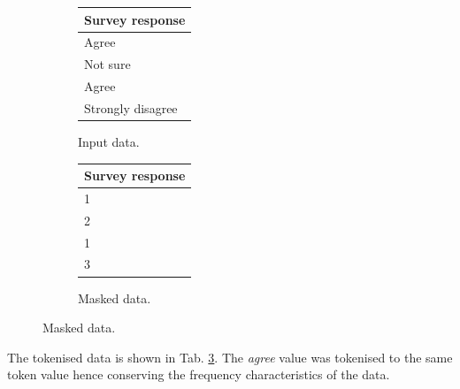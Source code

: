 \documentclass[a4paper,twoside,12pt]{book}
\begin{document}
\begin{figure}
\centering
\caption{Tokenisation.}
\begin{subfigure}{.4\textwidth}
	\centering
	\caption{Input data.}
	\label{id:tab:tokenisation_raw}
	\begin{tabular}{l}
	\toprule
	\multicolumn{1}{c}{Survey response} \\ \midrule
	Agree                               \\
	Not sure                            \\
	Agree                               \\
	Strongly disagree                   \\ \bottomrule
	\end{tabular}
\end{subfigure}
\begin{subfigure}{.4\textwidth}
	\centering
	\caption{Masked data.}
	\label{id:tab:tokenisation_masked}
	\begin{tabular}{l}
	\toprule
	
	\multicolumn{1}{c}{Survey response} \\ \midrule
	1                                   \\
	2                                   \\
	1                                   \\
	3                                   \\ \bottomrule
	\end{tabular}
\end{subfigure}
\end{figure}

The tokenised data is shown in Tab. \ref{id:tab:tokenisation_masked}. The \textit{agree} value was tokenised to the same token value hence conserving the frequency characteristics of the data.

%
\end{document}
